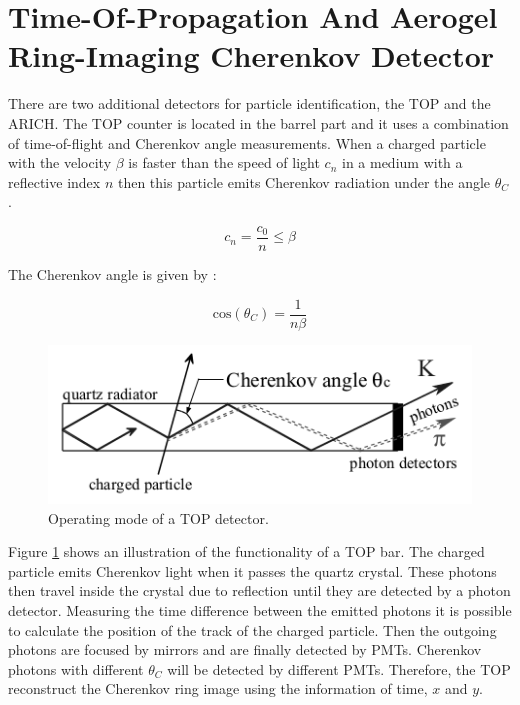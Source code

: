 \documentclass[a4paper,11pt,twosided,final,german,openbib,pdftex,listof=totoc,bibliography=totoc]{scrbook}
\begin{document}
\section{Time-Of-Propagation And Aerogel Ring-Imaging Cherenkov Detector}
\label{sec:ARTO}

There are two additional detectors for particle identification, the TOP and the ARICH. The TOP counter is located in the barrel part and it uses a combination of time-of-flight and Cherenkov angle measurements.
When a charged particle with the velocity $\beta$ is faster than the speed of light $c_n$ in a medium with a reflective index $n$ then this particle emits Cherenkov radiation under the angle $\theta_{C} $.\cite{cerenkovAngle}


\begin{equation}
c_n = \frac{c_0}{n} \leq \beta	
\end{equation}

The Cherenkov angle is given by \cite{cerenkovAngle}:

\begin{equation}
\textrm{cos}(\theta_C)=\frac{1}{n\beta}
\end{equation}

\begin{figure}[h!]
	\centering
	\includegraphics[width=12cm]{Bilder/TOP}
	\caption[TOP Principle]{Operating mode of a TOP detector.\cite{B2TR}}
	\label{fig:TOP}
\end{figure}

Figure \ref{fig:TOP} shows an illustration of the functionality of a TOP bar. The charged particle emits Cherenkov light when it passes the quartz crystal. These photons then travel inside the crystal due to reflection until they are detected by a photon detector. Measuring the time difference between the emitted photons it is possible to calculate the position of the track of the charged particle. Then the outgoing photons are focused by mirrors and are finally detected by PMTs. Cherenkov photons with different $\theta_C$ will be detected by different PMTs. Therefore, the TOP reconstruct the Cherenkov ring image using the information of time, $x$ and $y$.\cite{B2TR} 
\end{document}
